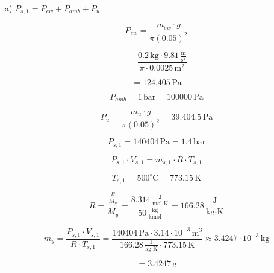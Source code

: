 a) \( P_{s,1} = P_{ew} + P_{amb} + P_u \)

\[
P_{ew} = \frac{m_{ew} \cdot g}{\pi (0.05)^2}
\]

\[
= \frac{0.2 \, \text{kg} \cdot 9.81 \, \frac{\text{m}}{\text{s}^2}}{\pi \cdot 0.0025 \, \text{m}^2}
\]

\[
= 124.405 \, \text{Pa}
\]

\[
P_{amb} = 1 \, \text{bar} = 100000 \, \text{Pa}
\]

\[
P_u = \frac{m_u \cdot g}{\pi (0.05)^2} = 39.404.5 \, \text{Pa}
\]

\[
P_{s,1} = 140404 \, \text{Pa} = 1.4 \, \text{bar}
\]

\[
P_{s,1} \cdot V_{s,1} = m_{s,1} \cdot R \cdot T_{s,1}
\]

\[
T_{s,1} = 500^\circ \text{C} = 773.15 \, \text{K}
\]

\[
R = \frac{\frac{R}{M_y}}{M_y} = \frac{8.314 \, \frac{\text{J}}{\text{mol} \cdot \text{K}}}{50 \, \frac{\text{kg}}{\text{kmol}}} = 166.28 \, \frac{\text{J}}{\text{kg} \cdot \text{K}}
\]

\[
m_y = \frac{P_{s,1} \cdot V_{s,1}}{R \cdot T_{s,1}} = \frac{140404 \, \text{Pa} \cdot 3.14 \cdot 10^{-3} \, \text{m}^3}{166.28 \, \frac{\text{J}}{\text{kg} \cdot \text{K}} \cdot 773.15 \, \text{K}} \approx 3.4247 \cdot 10^{-3} \, \text{kg}
\]

\[
= 3.4247 \, \text{g}
\]